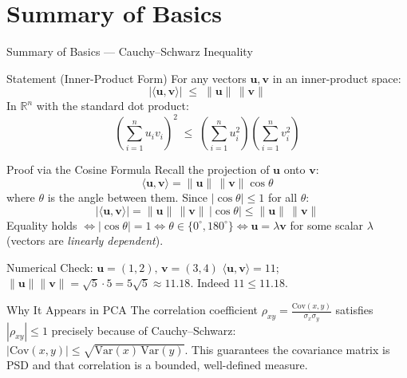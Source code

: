 \documentclass{beamer}
\begin{document}
\section*{Summary of Basics}

\begin{frame}[shrink=10]{Summary of Basics --- Cauchy--Schwarz Inequality}
  \begin{block}{Statement (Inner-Product Form)}
    For any vectors $\mathbf{u}, \mathbf{v}$ in an inner-product space:
    \[
      |\langle \mathbf{u}, \mathbf{v}\rangle|
        \;\leq\;
        \|\mathbf{u}\|\,\|\mathbf{v}\|
    \]
    In $\mathbb{R}^n$ with the standard dot product:
    \[
      \left(\sum_{i=1}^n u_i v_i\right)^{\!2}
        \;\leq\;
        \left(\sum_{i=1}^n u_i^2\right)
        \left(\sum_{i=1}^n v_i^2\right)
    \]
  \end{block}

  \begin{block}{Proof via the Cosine Formula}
    Recall the projection of $\mathbf{u}$ onto $\mathbf{v}$:
    \[
      \langle \mathbf{u},\mathbf{v}\rangle
        = \|\mathbf{u}\|\,\|\mathbf{v}\|\cos\theta
    \]
    where $\theta$ is the angle between them.
    Since $|\cos\theta| \leq 1$ for all $\theta$:
    \[
      |\langle \mathbf{u},\mathbf{v}\rangle|
        = \|\mathbf{u}\|\,\|\mathbf{v}\|\,|\cos\theta|
        \leq \|\mathbf{u}\|\,\|\mathbf{v}\|
    \]
    Equality holds $\Leftrightarrow |\cos\theta|=1 \Leftrightarrow
    \theta \in \{0^\circ,180^\circ\} \Leftrightarrow
    \mathbf{u} = \lambda\mathbf{v}$ for some scalar $\lambda$
    (vectors are \emph{linearly dependent}).
  \end{block}

  \begin{exampleblock}{Numerical Check: $\mathbf{u}=(1,2),\,\mathbf{v}=(3,4)$}
    $\langle\mathbf{u},\mathbf{v}\rangle = 11$;\quad
    $\|\mathbf{u}\|\|\mathbf{v}\| = \sqrt{5}\cdot 5 = 5\sqrt{5} \approx 11.18$.
    Indeed $11 \leq 11.18$. \checkmark
  \end{exampleblock}

  \begin{alertblock}{Why It Appears in PCA}
    The correlation coefficient $\rho_{xy} = \frac{\mathrm{Cov}(x,y)}{\sigma_x\sigma_y}$
    satisfies $|\rho_{xy}| \leq 1$ precisely because of Cauchy--Schwarz:
    $|\mathrm{Cov}(x,y)| \leq \sqrt{\mathrm{Var}(x)\,\mathrm{Var}(y)}$.
    This guarantees the covariance matrix is PSD and that correlation
    is a bounded, well-defined measure.
  \end{alertblock}
\end{frame}
\end{document}
